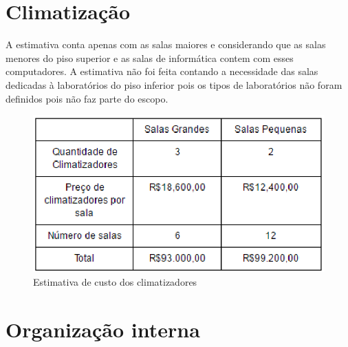 \section{Climatização}
A estimativa conta apenas com as salas maiores e considerando que as salas menores do piso superior e as salas de informática contem com esses computadores. A estimativa não foi feita contando a necessidade das salas dedicadas à laboratórios do piso inferior pois os tipos de laboratórios não foram definidos pois não faz parte do escopo.  

\begin{figure}[!ht]
\centering
\includegraphics[keepaspectratio=true,scale=1]{figuras/tabela_climatizadores.eps}
\caption{Estimativa de custo dos climatizadores}
\end{figure}

\section{Organização interna}
